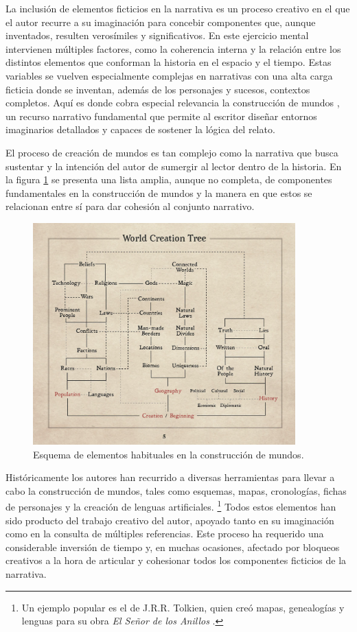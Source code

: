 La inclusión de elementos ficticios en la narrativa es un proceso creativo
en el que el autor recurre a su imaginación para concebir componentes que, aunque inventados,
resulten verosímiles y significativos.
En este ejercicio mental intervienen múltiples factores, como la coherencia interna y la relación 
entre los distintos elementos que conforman la historia en el espacio y el tiempo.
Estas variables se vuelven especialmente complejas en narrativas con una alta carga ficticia
donde se inventan, además de los personajes y sucesos, contextos completos.
Aquí es donde cobra especial relevancia la construcción de mundos \cite{world_building}, un recurso narrativo fundamental que permite
al escritor diseñar entornos imaginarios detallados y capaces de sostener la lógica del relato.

El proceso de creación de mundos es tan complejo como la narrativa que busca sustentar y
la intención del autor de sumergir al lector dentro de la historia.
En la figura \ref{fig:worldBuildingElements} se presenta una lista amplia, aunque no completa,
de componentes fundamentales en la construcción de mundos 
y la manera en que estos se relacionan entre sí para dar cohesión al conjunto narrativo.

\begin{figure}[htbp]
	\centering
	\includegraphics[width=0.9\textwidth]{./Figures/world-building-elements.png}
	\caption{Esquema de elementos habituales en la construcción de mundos.}
	\label{fig:worldBuildingElements}
\end{figure}

Históricamente los autores han recurrido a diversas herramientas para llevar a cabo la construcción de mundos,
tales como esquemas, mapas, cronologías, fichas de personajes y la creación de lenguas artificiales.
\footnote{Un ejemplo popular es el de J.R.R. Tolkien, quien creó mapas, genealogías y lenguas para su obra
\textit{El Señor de los Anillos} \cite{tolkien_letters}.}
Todos estos elementos han sido producto del trabajo creativo del autor, apoyado tanto en su imaginación como en la
consulta de múltiples referencias.
Este proceso ha requerido una considerable inversión de tiempo y, en muchas ocasiones,
afectado por bloqueos creativos a la hora de articular y cohesionar todos los componentes ficticios de la narrativa.

